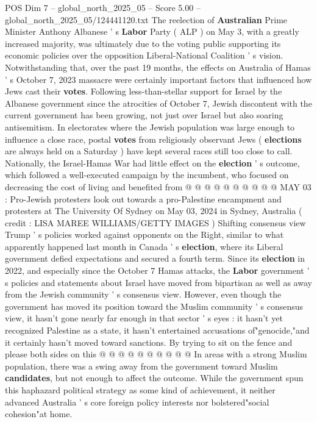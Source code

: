 \begin{textsample}{POS Dim 7 – global\_north\_2025\_05 – Score 5.00 – global\_north\_2025\_05/124441120.txt}  \label{ex:f7_pos_333}
The reelection of \textbf{Australian} Prime Minister Anthony Albanese ' s \textbf{Labor} Party ( ALP ) on May 3, with a greatly increased majority, was ultimately due to the voting public supporting its economic policies over the opposition Liberal-National Coalition ' s vision.
Notwithstanding that, over the past 19 months, the effects on Australia of Hamas ' s October 7, 2023 massacre were certainly important factors that influenced how Jews cast their \textbf{votes}.
Following less-than-stellar support for Israel by the Albanese government since the atrocities of October 7, Jewish discontent with the current government has been growing, not just over Israel but also soaring antisemitism.
In electorates where the Jewish population was large enough to influence a close race, postal \textbf{votes} from religiously observant Jews ( \textbf{elections} are always held on a Saturday ) have kept several races still too close to call.
Nationally, the Israel-Hamas War had little effect on the \textbf{election} ' s outcome, which followed a well-executed campaign by the incumbent, who focused on decreasing the cost of living and benefited from @ @ @ @ @ @ @ @ @ @ MAY 03 : Pro-Jewish protesters look out towards a pro-Palestine encampment and protesters at The University Of Sydney on May 03, 2024 in Sydney, Australia ( credit : LISA MAREE WILLIAMS/GETTY IMAGES ) Shifting consensus view Trump ' s policies worked against opponents on the Right, similar to what apparently happened last month in Canada ' s \textbf{election}, where its Liberal government defied expectations and secured a fourth term.
Since its \textbf{election} in 2022, and especially since the October 7 Hamas attacks, the \textbf{Labor} government ' s policies and statements about Israel have moved from bipartisan as well as away from the Jewish community ' s consensus view.
However, even though the government has moved its position toward the Muslim community ' s consensus view, it hasn't gone nearly far enough in that sector ' s eyes : it hasn't yet recognized Palestine as a state, it hasn't entertained accusations of"genocide,"and it certainly hasn't moved toward sanctions.
By trying to sit on the fence and please both sides on this @ @ @ @ @ @ @ @ @ @ In areas with a strong Muslim population, there was a swing away from the government toward Muslim \textbf{candidates}, but not enough to affect the outcome.
While the government spun this haphazard political strategy as some kind of achievement, it neither advanced Australia ' s core foreign policy interests nor bolstered"social cohesion"at home.

\end{textsample}
